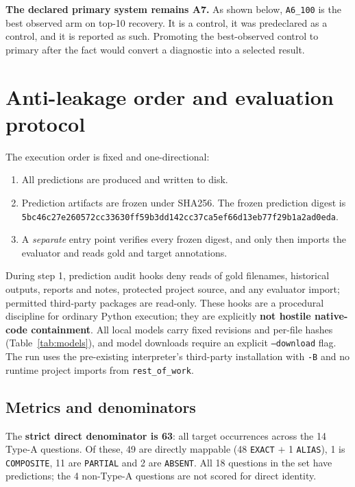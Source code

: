 \documentclass[11pt,a4paper]{article}
\newcommand{\hx}[2]{\texttt{#1}\allowbreak\texttt{#2}}
\begin{document}
\textbf{The declared primary system remains A7.} As shown below, \texttt{A6\_100} is the best observed arm on
top-10 recovery. It is a control, it was predeclared as a control, and it is reported as such. Promoting the
best-observed control to primary after the fact would convert a diagnostic into a selected result.

\section{Anti-leakage order and evaluation protocol}
\label{sec:leak}

The execution order is fixed and one-directional:

\begin{enumerate}
\item All predictions are produced and written to disk.
\item Prediction artifacts are frozen under SHA256. The frozen prediction digest is \\
\hx{5bc46c27e260572cc33630ff59b3dd14}{2cc37ca5ef66d13eb77f29b1a2ad0eda}.
\item A \emph{separate} entry point verifies every frozen digest, and only then imports the evaluator and
reads gold and target annotations.
\end{enumerate}

During step 1, prediction audit hooks deny reads of gold filenames, historical outputs, reports and notes,
protected project source, and any evaluator import; permitted third-party packages are read-only. These
hooks are a procedural discipline for ordinary Python execution; they are explicitly \textbf{not hostile
native-code containment}. All local models carry fixed revisions and per-file hashes
(Table~\ref{tab:models}), and model downloads require an explicit \texttt{--download} flag. The run uses the
pre-existing interpreter's third-party installation with \texttt{-B} and no runtime project imports from
\texttt{rest\_of\_work}.

\subsection{Metrics and denominators}
\label{sec:metrics}

The \textbf{strict direct denominator is 63}: all target occurrences across the 14 Type-A questions. Of
these, 49 are directly mappable (48 \texttt{EXACT} $+$ 1 \texttt{ALIAS}), 1 is \texttt{COMPOSITE}, 11 are
\texttt{PARTIAL} and 2 are \texttt{ABSENT}. All 18 questions in the set have predictions; the 4 non-Type-A
questions are not scored for direct identity.
\end{document}
